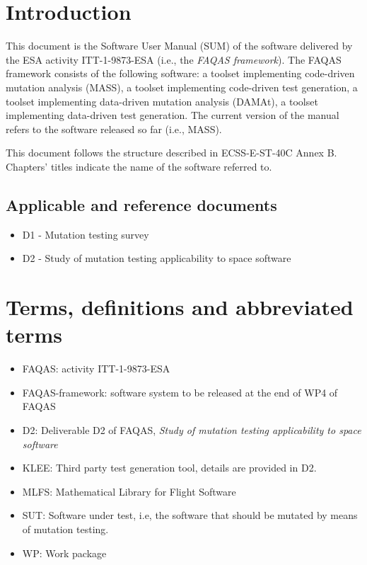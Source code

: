 
\chapter{Introduction}

This document is the Software User Manual (SUM) of the software delivered by the ESA activity ITT-1-9873-ESA (i.e., the \emph{FAQAS framework}).
The FAQAS framework consists of the following software: a toolset  implementing code-driven mutation analysis (MASS), a toolset implementing code-driven test generation, a toolset implementing data-driven mutation analysis (DAMAt), a toolset implementing data-driven test generation. The current version of the manual refers to the software released so far (i.e., MASS).

This document follows the structure described in ECSS-E-ST-40C Annex B. Chapters' titles indicate the name of the software referred to.



\section{Applicable and reference documents}

\begin{itemize}
\item{D1 - Mutation testing survey}
\item{D2 - Study of mutation testing applicability to space software}
\end{itemize}

\chapter{Terms, definitions and abbreviated terms}

\begin{itemize}
\item{FAQAS}: activity ITT-1-9873-ESA
\item{FAQAS-framework}: software system to be released at the end of WP4 of FAQAS
\item{D2}: Deliverable D2 of FAQAS, \emph{Study of mutation testing applicability to space software}
\item{KLEE}: Third party test generation tool, details are provided in D2.
\item{MLFS}: Mathematical Library for Flight Software
\item{SUT}: Software under test, i.e, the software that should be mutated by means of mutation testing.
\item{WP}: Work package

\end{itemize}

\clearpage
